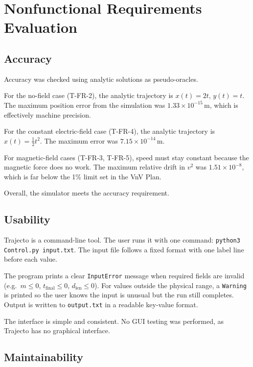 \documentclass[12pt, titlepage]{article}
\begin{document}
\section{Nonfunctional Requirements Evaluation}

\subsection{Accuracy}

Accuracy was checked using analytic solutions as pseudo-oracles.

For the no-field case (T-FR-2), the analytic trajectory is $x(t)=2t$,
$y(t)=t$.
The maximum position error from the simulation was $1.33\times10^{-15}$\,m,
which is effectively machine precision.

For the constant electric-field case (T-FR-4), the analytic trajectory is
$x(t)=\tfrac{1}{2}t^2$.
The maximum error was $7.15\times10^{-14}$\,m.

For magnetic-field cases (T-FR-3, T-FR-5), speed must stay constant because
the magnetic force does no work.
The maximum relative drift in $v^2$ was $1.51\times10^{-8}$, which is
far below the 1\% limit set in the VnV Plan.

Overall, the simulator meets the accuracy requirement.

\subsection{Usability}

Trajecto is a command-line tool.
The user runs it with one command: \texttt{python3 Control.py input.txt}.
The input file follows a fixed format with one label line before each value.

The program prints a clear \texttt{InputError} message when required fields
are invalid (e.g.\ $m\le0$, $t_\text{final}\le0$, $d_\text{len}\le0$).
For values outside the physical range, a \texttt{Warning} is printed so
the user knows the input is unusual but the run still completes.
Output is written to \texttt{output.txt} in a readable key-value format.

The interface is simple and consistent.
No GUI testing was performed, as Trajecto has no graphical interface.

\subsection{Maintainability}
\end{document}
